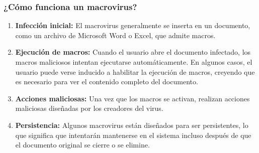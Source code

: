 \subsubsection{ ¿Cómo funciona un macrovirus?
}
\begin{tcolorbox}[title= Funcionamiento de un macrovirus]
	\begin{enumerate}
		
		
		\item \textbf{Infección inicial:}
		El macrovirus generalmente se inserta en un documento, como un archivo de Microsoft Word o Excel, que admite macros.  
		\item \textbf{Ejecución de macros:}
		Cuando el usuario abre el documento infectado, los macros maliciosos intentan ejecutarse automáticamente. En algunos casos, el usuario puede verse inducido a habilitar la ejecución de macros, creyendo que es necesario para ver el contenido completo del documento.
		\item \textbf{Acciones maliciosas:}
		Una vez que los macros se activan, realizan acciones maliciosas diseñadas por los creadores del virus. 
		\item \textbf{Persistencia:} 	
		Algunos macrovirus están diseñados para ser persistentes, lo que significa que intentarán mantenerse en el sistema incluso después de que el documento original se cierre o se elimine.
	
		
	\end{enumerate}
\end{tcolorbox}
